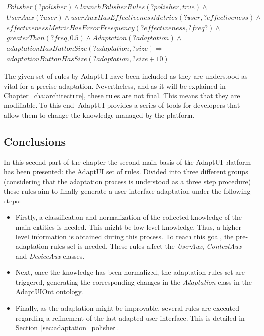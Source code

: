 \footnotesize
\begin{equation} \label{ec:post_adaptation_rule}
  \begin{align*} 
  Polisher(?polisher) ∧ launchPolisherRules(?polisher, true) ∧\\
  UserAux(?user) ∧ userAuxHasEffectivenessMetrics(?user, ?effectiveness) ∧ \\
  effectivenessMetricHasErrorFreequency(?effectiveness, ?freq?) ∧\\
  greaterThan(?freq, 0.5) ∧ Adaptation(?adaptation) ∧\\
  adaptationHasButtonSize(?adaptation, ?size)
  \Rightarrow \\
  adaptationButtonHasSize(?adaptation, ?size + 10)
  \end{align*}
\end{equation}
\normalsize



The given set of rules by AdaptUI have been included as they are understood as
vital for a precise adaptation. Nevertheless, and as it will be explained in
Chapter~\ref{cha:architecture}, these rules are not final. This means that they
are modifiable. To this end, AdaptUI provides a series of tools for developers
that allow them to change the knowledge managed by the platform.


\subsection{Conclusions}
\label{sec:rules_conclusions}

In this second part of the chapter the second main basis of the AdaptUI platform
has been presented: the AdaptUI set of rules. Divided into three different groups
(considering that the adaptation process is understood as a three step procedure)
these rules aim to finally generate a user interface adaptation under the following
steps:

\begin{itemize}
  \item Firstly, a classification and normalization of the collected knowledge of
  the main entities is needed. This might be low level knowledge. Thus, a higher
  level information is obtained during this process. To reach this goal, the
  pre-adaptation rules set is needed. These rules affect the \textit{UserAux},
  \textit{ContextAux} and \textit{DeviceAux} classes.
  
  \item Next, once the knowledge has been normalized, the adaptation rules set
  are triggered, generating the corresponding changes in the \textit{Adaptation}
  class in the AdaptUIOnt ontology.
  
  \item Finally, as the adaptation might be improvable, several rules are executed
  regarding a refinement of the last adapted user interface. This is detailed
  in Section~\ref{sec:adaptation_polisher}.
\end{itemize}